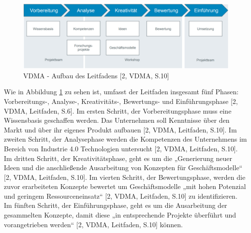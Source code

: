 \begin{figure}[h]
	\centering
	\includegraphics[width=1\linewidth]{Bilder/A5_VDMA_Phasen}
	\caption{VDMA - Aufbau des Leitfadens [2, VDMA, S.10]}
	\label{fig:VDMAAufbauLeitfaden}
\end{figure}

Wie in Abbildung \ref{fig:VDMAAufbauLeitfaden} zu sehen ist, umfasst der Leitfaden insgesamt fünf Phasen: Vorbereitungs-, Analyse-, Kreativitäts-, Bewertungs- und Einführungsphase [2, VDMA, Leitfaden, S.6]. Im ersten Schritt, der Vorbereitungsphase muss eine Wissensbasis geschaffen werden. Das Unternehmen soll Kenntnisse über den Markt und über ihr eigenes Produkt aufbauen [2, VDMA, Leitfaden, S.10]. Im zweiten Schritt, der Analysephase werden die Kompetenzen des Unternehmens im Bereich von Industrie 4.0 Technologien untersucht [2, VDMA, Leitfaden, S.10]. Im dritten Schritt, der Kreativitätsphase, geht es um die „Generierung neuer Ideen und die anschließende Ausarbeitung von Konzepten für Geschäftsmodelle“ [2, VDMA, Leitfaden, S.10]. Im vierten Schritt, der Bewertungsphase, werden die zuvor erarbeiteten Konzepte bewertet um Geschäftsmodelle „mit hohen Potenzial und geringem Ressourceneinsatz“ [2, VDMA, Leitfaden, S.10] zu identifizieren. Im fünften Schritt, der Einführungsphase, geht es um die Ausarbeitung der gesammelten Konzepte, damit diese „in entsprechende Projekte überführt und vorangetrieben werden“ [2, VDMA, Leitfaden, S.10] können.


